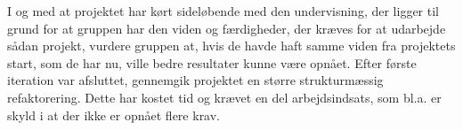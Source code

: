 I og med at projektet har kørt sideløbende med den undervisning, der ligger til grund for at gruppen har den viden og færdigheder, der kræves for at udarbejde sådan projekt, vurdere gruppen at, hvis de havde haft samme viden fra projektets start, som de har nu, ville bedre resultater kunne være opnået. Efter første iteration var afsluttet, gennemgik projektet en større strukturmæssig refaktorering. Dette har kostet tid og krævet en del arbejdsindsats, som bl.a. er skyld i at der ikke er opnået flere krav. 